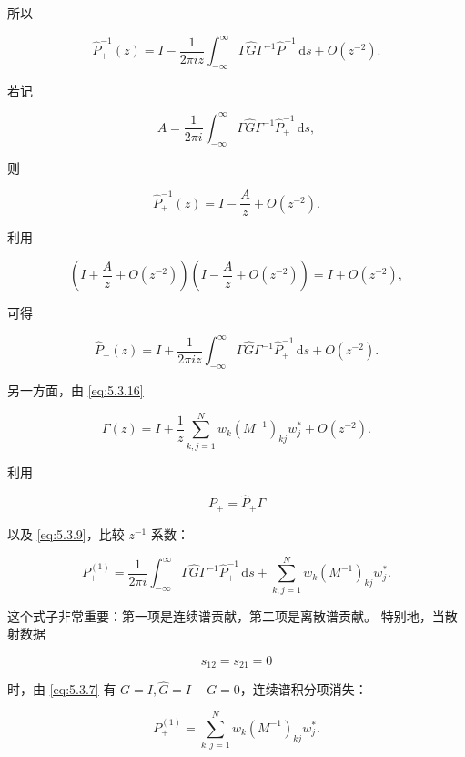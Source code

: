 \documentclass[
    lang=cn,
    scheme=chinese,
    mode=simple,
    device=normal,
    color=blue,
    math=cm,
    thmcnt=section,
    12pt,
    nowatermark
]{elegantbook}
\begin{document}
所以

\[
    \widehat P_+^{-1}(z)
    =
    I-
    \dfrac{1}{2\pi iz}
    \int_{-\infty}^{\infty}
    \Gamma\widehat G\Gamma^{-1}\widehat P_+^{-1}
    \,\mathrm ds
    +O(z^{-2}).
\]

若记

\[
    A=
    \dfrac{1}{2\pi i}
    \int_{-\infty}^{\infty}
    \Gamma\widehat G\Gamma^{-1}\widehat P_+^{-1}
    \,\mathrm ds,
\]

则

\[
    \widehat P_+^{-1}(z)=I-\dfrac{A}{z}+O(z^{-2}).
\]

利用

\[
    \left(I+\dfrac{A}{z}+O(z^{-2})\right)
    \left(I-\dfrac{A}{z}+O(z^{-2})\right)
    =I+O(z^{-2}),
\]

可得

\begin{equation}
    \widehat P_+(z)
    =
    I+
    \dfrac{1}{2\pi iz}
    \int_{-\infty}^{\infty}
    \Gamma\widehat G\Gamma^{-1}\widehat P_+^{-1}\,\mathrm ds
    +
    O(z^{-2}).
    \tag{5.4.7}
    \label{eq:5.4.7}
\end{equation}

另一方面，由 \eqref{eq:5.3.16}

\begin{equation}
    \Gamma(z)
    =
    I+
    \dfrac{1}{z}
    \sum\limits_{k,j=1}^{N}
    w_k(M^{-1})_{kj}w_j^*
    +
    O(z^{-2}).
    \tag{5.4.8}
    \label{eq:5.4.8}
\end{equation}

利用

\[
    P_+=\widehat P_+\Gamma
\]

以及 \eqref{eq:5.3.9}，比较 $z^{-1}$ 系数：

\begin{equation}
    P_+^{(1)}
    =
    \dfrac{1}{2\pi i}
    \int_{-\infty}^{\infty}
    \Gamma\widehat G\Gamma^{-1}\widehat P_+^{-1}\,\mathrm ds
    +
    \sum\limits_{k,j=1}^{N}
    w_k(M^{-1})_{kj}w_j^*.
    \tag{5.4.9}
    \label{eq:5.4.9}
\end{equation}

这个式子非常重要：第一项是连续谱贡献，第二项是离散谱贡献。
特别地，当散射数据

\[
    s_{12}=s_{21}=0
\]

时，由 \eqref{eq:5.3.7} 有 $G=I,\widehat G=I-G=0$，连续谱积分项消失：

\[
    P_+^{(1)}
    =
    \sum\limits_{k,j=1}^{N}
    w_k(M^{-1})_{kj}w_j^*.
\]
\end{document}

